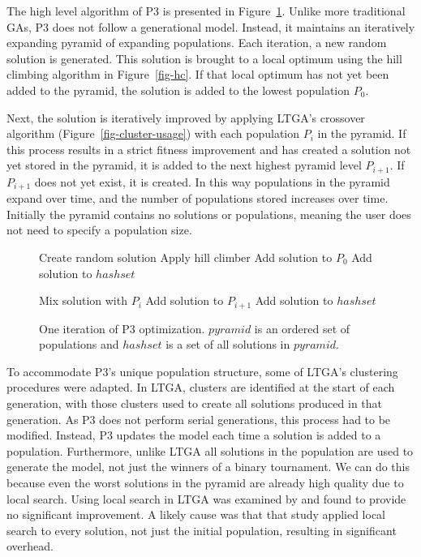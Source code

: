 \documentclass[twoside]{article}
\begin{document}
The high level algorithm of P3 is presented in Figure~\ref{fig-p3}. Unlike more traditional
GAs, P3 does not follow a generational model. Instead, it maintains an iteratively
expanding pyramid of expanding populations. Each iteration, a new random solution is generated.
This solution is brought to a local optimum using the hill climbing algorithm in Figure~\ref{fig-hc}. If that
local optimum has not yet been added to the pyramid, the solution is added to the lowest
population $P_0$.

Next, the solution is iteratively improved by applying LTGA's crossover algorithm (Figure~\ref{fig-cluster-usage})
with each population $P_i$ in the pyramid. If this process results in a strict fitness improvement and has
created a solution not yet stored in the pyramid, it is added to the next highest pyramid level $P_{i+1}$.
If $P_{i+1}$ does not yet exist, it is created. In this way populations in the pyramid expand over time,
and the number of populations stored increases over time. Initially the pyramid contains no solutions
or populations, meaning the user does not need to specify a population size.


\begin{figure}
  \begin{algorithmic}[1]
    \State Create random solution
    \State Apply hill climber
      \State Add solution to $P_0$
      \State Add solution to $hashset$
    \EndIf

      \State Mix solution with $P_i$
          \State Add solution to $P_{i+1}$
          \State Add solution to $hashset$
        \EndIf
      \EndIf
    \EndFor
  \EndProcedure
\end{algorithmic}
  \caption{One iteration of P3 optimization. $pyramid$ is an
           ordered set of populations and $hashset$ is a set
           of all solutions in $pyramid$.}
  \label{fig-p3}
\end{figure}

To accommodate P3's unique population structure, some of LTGA's clustering procedures were adapted. In LTGA,
clusters are identified at the start of each generation, with those clusters used
to create all solutions produced in that generation. As P3 does not perform serial
generations, this process had to be modified. Instead, P3 updates the model each
time a solution is added to a population. Furthermore, unlike
LTGA all solutions in the population are used to generate the model, not just the
winners of a binary tournament. We can do this because even the
worst solutions in the pyramid are already high quality due to local search.
Using local search in LTGA was examined by \cite{bosman:2011:lsbbo} and found
to provide no significant improvement. A likely cause was that that study applied
local search to every solution, not just the initial population, resulting in significant overhead.
\end{document}
